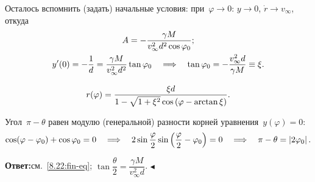 \documentclass{weekly}
\begin{document}
Осталось вспомнить (задать) начальные условия:
при~$\varphi \to 0$: $y \to 0$, $\dot r \to v_\infty$, откуда
\begin{gather}
    A = -\frac{\gamma M}{v_\infty^2 d^2 \cos\varphi_0}; \\
    y'(0) = -\frac{1}{d} = \frac{\gamma M}{v_\infty^2 d^2} \tan\varphi_0
        \quad \Longrightarrow \quad \tan\varphi_0 = -\frac{v_\infty^2 d}{\gamma M}
        \equiv \xi. \\[2ex]
    r(\varphi) = \frac{\xi d}{1 - \sqrt{1 + \xi^2}
            \cos\left(\varphi - \arctan\xi\right)}.
        \label{8.22:fin-eq}
\end{gather}

Угол~$\pi - \theta$ равен модулю (генеральной) разности корней
уравнения~$y(\varphi) = 0$:
\begin{gather}
    \cos(\varphi - \varphi_0) + \cos\varphi_0 = 0
    \quad \Longrightarrow \quad
    2 \sin\frac{\varphi}{2}
        \sin\left(\frac{\varphi}{2} - \varphi_0\right) = 0
    \quad \Longrightarrow \quad
    \pi - \theta = \left| 2\varphi_0 \right|.
\end{gather}

\textbf{Ответ:}\qquad см.~\eqref{8.22:fin-eq}; \quad
$\tan\dfrac{\theta}{2} = \dfrac{\gamma M}{v_\infty^2 d}$.
\hfill $\blacktriangleleft$
\end{document}
